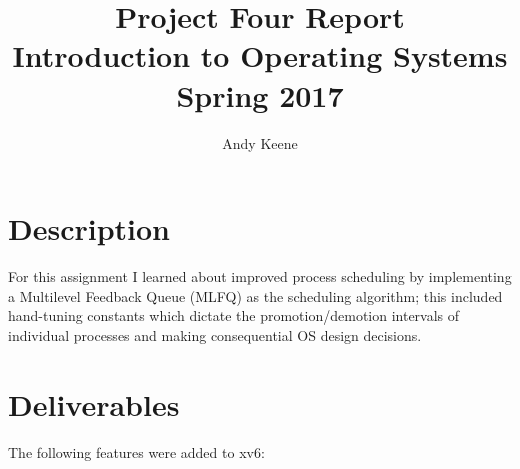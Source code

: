 \documentclass[11pt,letterpaper]{report}
\author{Andy Keene}
\title{Project Four Report\\Introduction to Operating Systems\\ Spring 2017}
\date{}
\begin{document}
\newcommand{\ctrl}[1]{ctrl\,--\,#1}
	\maketitle
	

	\section*{Description}
	For this assignment I learned about improved process scheduling by implementing a Multilevel Feedback Queue (MLFQ) as the scheduling algorithm; this included hand-tuning constants which dictate the promotion/demotion intervals of individual processes and making consequential OS design decisions. 
	
	 
		
	\section*{Deliverables}
	The following features were added to xv6:
	
\end{document}
